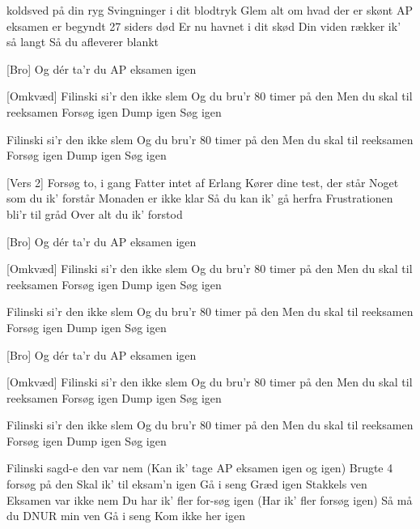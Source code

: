 \documentclass{article}
\begin{document}
\begin{song}
[Vers 1] 
 koldsved på din ryg
Svingninger i dit blodtryk
Glem alt om hvad der er skønt
AP eksamen er begyndt
27 siders død
Er nu havnet i dit skød
Din viden rækker ik’ så langt
Så du afleverer blankt

[Bro]
 Og dér ta’r du AP eksamen igen

[Omkvæd]
 Filinski si’r den ikke slem
Og du bru’r 80 timer på den
Men du skal til reeksamen
Forsøg igen
Dump igen
Søg igen

 Filinski si’r den ikke slem
Og du bru’r 80 timer på den
Men du skal til reeksamen
Forsøg igen
Dump igen
Søg igen

[Vers 2]
 Forsøg to, i gang
Fatter intet af Erlang 
Kører dine test, der står
Noget som du ik’ forstår
Monaden er ikke klar
Så du kan ik’ gå herfra
Frustrationen bli’r til gråd
Over alt du ik’ forstod

[Bro]
 Og dér ta’r du AP eksamen igen

[Omkvæd]
 Filinski si’r den ikke slem
Og du bru’r 80 timer på den
Men du skal til reeksamen
Forsøg igen
Dump igen
Søg igen

 Filinski si’r den ikke slem
Og du bru’r 80 timer på den
Men du skal til reeksamen
Forsøg igen
Dump igen
Søg igen

[Bro]
 Og dér ta’r du AP eksamen igen

[Omkvæd]
 Filinski si’r den ikke slem
Og du bru’r 80 timer på den
Men du skal til reeksamen
Forsøg igen
Dump igen
Søg igen

 Filinski si’r den ikke slem
Og du bru’r 80 timer på den
Men du skal til reeksamen
Forsøg igen
Dump igen
Søg igen

 Filinski  sagd-e den var nem
 (Kan ik’ tage AP eksamen igen og igen)
 Brugte 4 forsøg på den
Skal ik’ til eksam’n igen
Gå i seng
Græd igen
Stakkels ven
Eksamen var ikke nem
Du har ik’ fler for-søg igen
 (Har ik’ fler forsøg igen)
 Så må du DNUR min ven
Gå i seng
Kom ikke
her igen



\end{song}
\end{document}
